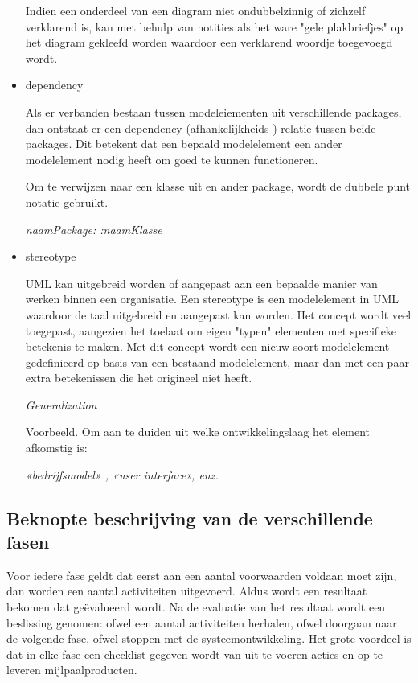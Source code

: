 \begin{itemize}
Indien een onderdeel van een diagram niet ondubbelzinnig of zichzelf verklarend is, kan met behulp van notities als het ware "gele plakbriefjes" op het diagram gekleefd worden waardoor een verklarend woordje toegevoegd wordt.
      \item dependency
      
Als er verbanden bestaan tussen modeleiementen uit verschillende packages, dan ontstaat er een dependency (afhankelijkheids-) relatie tussen beide packages. Dit betekent dat een bepaald modelelement een ander modelelement nodig heeft om goed te kunnen functioneren.

Om te verwijzen naar een klasse uit en ander package, wordt de dubbele punt notatie gebruikt.

\begin{center} \textit{naamPackage: :naamKlasse}\end{center}
\newpage
      \item stereotype
      
UML kan uitgebreid worden of aangepast aan een bepaalde manier van werken binnen een organisatie. Een stereotype is een modelelement in UML waardoor de taal uitgebreid en aangepast kan worden. Het concept wordt veel toegepast, aangezien het toelaat om eigen "typen" elementen met specifieke betekenis te maken. Met dit concept wordt een nieuw soort modelelement gedefinieerd op basis van een bestaand modelelement, maar dan met een paar extra betekenissen die het origineel niet heeft.

\textit{Generalization}

Voorbeeld. Om aan te duiden uit welke ontwikkelingslaag het element afkomstig is:

\begin{center} \textit{«bedrijfsmodel» , «user interface», enz.}\end{center}

\end{itemize}

\subsection{Beknopte beschrijving van de verschillende fasen}

Voor iedere fase geldt dat eerst aan een aantal voorwaarden voldaan moet zijn, dan worden een aantal activiteiten uitgevoerd. Aldus wordt een resultaat bekomen dat geëvalueerd wordt. Na de evaluatie van het resultaat wordt een beslissing genomen: ofwel een aantal activiteiten herhalen, ofwel doorgaan naar de volgende fase, ofwel stoppen met de systeemontwikkeling. Het grote voordeel is dat in elke fase een checklist gegeven wordt van uit te voeren acties en op te leveren mijlpaalproducten.

